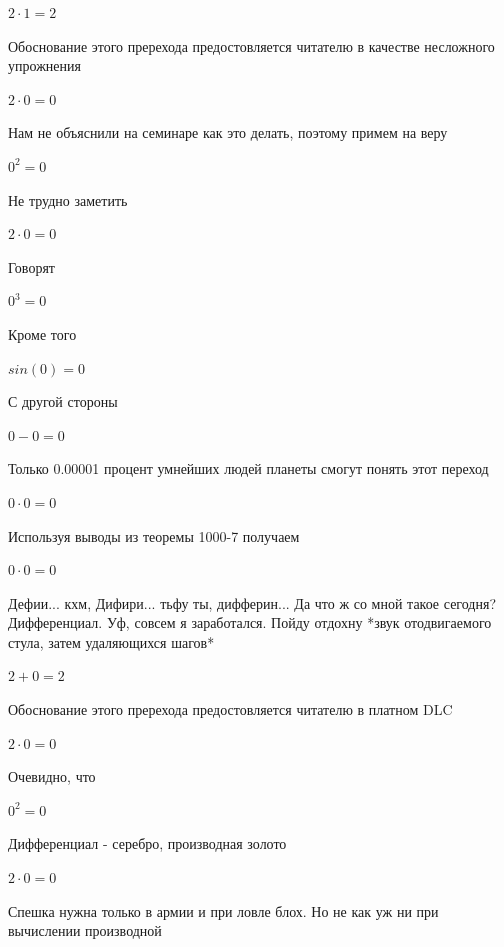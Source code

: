\documentclass[12pt,a4paper,fleqn]{article}
\begin{document}
\begin{center}$2 \cdot 1 = 2$\end{center}
Обоснование этого пререхода предостовляется читателю в качестве несложного упрожнения

\begin{center}$2 \cdot 0 = 0$\end{center}
Нам не объяснили на семинаре как это делать, поэтому примем на веру

\begin{center}$0^{2} = 0$\end{center}
Не трудно заметить

\begin{center}$2 \cdot 0 = 0$\end{center}
Говорят

\begin{center}$0^{3} = 0$\end{center}
Кроме того

\begin{center}$sin(0) = 0$\end{center}
С другой стороны

\begin{center}$0-0 = 0$\end{center}
Только 0.00001 процент умнейших людей планеты смогут понять этот переход

\begin{center}$0 \cdot 0 = 0$\end{center}
Используя выводы из теоремы 1000-7 получаем

\begin{center}$0 \cdot 0 = 0$\end{center}
Дефии... кхм, Дифири... тьфу ты, дифферин... Да что ж со мной такое сегодня? Дифференциал. Уф, совсем я заработался. Пойду отдохну *звук отодвигаемого стула, затем удаляющихся шагов*

\begin{center}$2+0 = 2$\end{center}
Обоснование этого пререхода предостовляется читателю в платном DLC

\begin{center}$2 \cdot 0 = 0$\end{center}
Очевидно, что

\begin{center}$0^{2} = 0$\end{center}
Дифференциал - серебро, производная золото\cite{link2}

\begin{center}$2 \cdot 0 = 0$\end{center}
Спешка нужна только в армии и при ловле блох. Но не как уж ни при вычислении производной\cite{link2}
\end{document}
